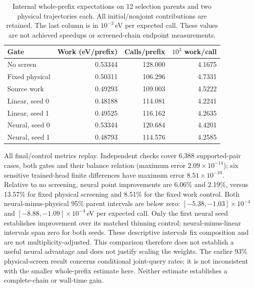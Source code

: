 \begin{table}[h]
\centering\small
\begin{tabular}{lrrr}
\toprule
Gate & Work (eV/prefix) & Calls/prefix & $10^3$ work/call \\
\midrule
No screen & 0.53344 & 128.000 & 4.1675 \\
Fixed physical & 0.50311 & 106.296 & 4.7331 \\
Source work & 0.49293 & 109.003 & 4.5222 \\
Linear, seed 0 & 0.48188 & 114.081 & 4.2241 \\
Linear, seed 1 & 0.49525 & 116.162 & 4.2635 \\
Neural, seed 0 & 0.53344 & 120.684 & 4.4201 \\
Neural, seed 1 & 0.48793 & 114.576 & 4.2585 \\
\bottomrule
\end{tabular}
\caption{Internal whole-prefix expectations on 12 selection parents and two
physical trajectories each. All initial/nonjoint contributions are retained.
The last column is in $10^{-3}$\,eV per expected call. These values are not
achieved speedups or screened-chain endpoint measurements.}
\label{tab:source-force-screen}
\end{table}

All final/control metrics replay. Independent checks cover 6,388 supported-pair
cases, both gates and their balance relation (maximum error
$2.09\times10^{-14}$); six sensitive trained-head finite differences have maximum
error $8.51\times10^{-10}$. Relative to no screening, neural point improvements
are 6.06\% and 2.19\%, versus 13.57\% for fixed physical screening and 8.51\% for
the fixed work control. Both neural-minus-physical 95\% parent intervals are
below zero: $[-5.38,-1.03]\times10^{-4}$ and
$[-8.88,-1.09]\times10^{-4}$\,eV per expected call. Only the first neural seed
establishes improvement over its matched thinning control; neural-minus-linear
intervals span zero for both seeds. These descriptive intervals fix composition
and are not multiplicity-adjusted. This comparison therefore does not establish
a useful neural advantage and does not justify scaling the weights. The earlier
93\% physical-screen result concerns conditional joint-query rates; it is not
inconsistent with the smaller whole-prefix estimate here. Neither estimate
establishes a complete-chain or wall-time gain.
